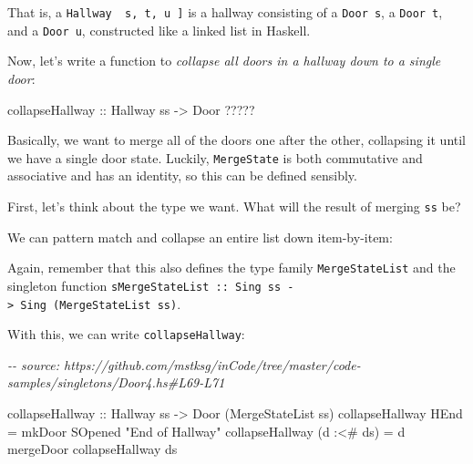 \documentclass[]{article}
\newenvironment{Shaded}{}{}
\newcommand{\CommentTok}[1]{\textcolor[rgb]{0.38,0.63,0.69}{\textit{#1}}}
\newcommand{\DataTypeTok}[1]{\textcolor[rgb]{0.56,0.13,0.00}{#1}}
\newcommand{\NormalTok}[1]{#1}
\newcommand{\OperatorTok}[1]{\textcolor[rgb]{0.40,0.40,0.40}{#1}}
\newcommand{\OtherTok}[1]{\textcolor[rgb]{0.00,0.44,0.13}{#1}}
\newcommand{\StringTok}[1]{\textcolor[rgb]{0.25,0.44,0.63}{#1}}
\begin{document}
That is, a \texttt{Hallway\ \textquotesingle{}{[}\ s,\ t,\ u\ {]}} is a hallway
consisting of a \texttt{Door\ s}, a \texttt{Door\ t}, and a \texttt{Door\ u},
constructed like a linked list in Haskell.

Now, let's write a function to \emph{collapse all doors in a hallway down to a
single door}:

\begin{Shaded}
\begin{Highlighting}[]
\OtherTok{collapseHallway ::} \DataTypeTok{Hallway}\NormalTok{ ss }\OtherTok{{-}\textgreater{}} \DataTypeTok{Door} \OperatorTok{?????}
\end{Highlighting}
\end{Shaded}

Basically, we want to merge all of the doors one after the other, collapsing it
until we have a single door state. Luckily, \texttt{MergeState} is both
commutative and associative and has an identity, so this can be defined
sensibly.

First, let's think about the type we want. What will the result of merging
\texttt{ss} be?

We can pattern match and collapse an entire list down item-by-item:

\begin{Shaded}
\end{Shaded}

Again, remember that this also defines the type family \texttt{MergeStateList}
and the singleton function
\texttt{sMergeStateList\ ::\ Sing\ ss\ -\textgreater{}\ Sing\ (MergeStateList\ ss)}.

With this, we can write \texttt{collapseHallway}:

\begin{Shaded}
\begin{Highlighting}[]
\CommentTok{{-}{-} source: https://github.com/mstksg/inCode/tree/master/code{-}samples/singletons/Door4.hs\#L69{-}L71}

\OtherTok{collapseHallway ::} \DataTypeTok{Hallway}\NormalTok{ ss }\OtherTok{{-}\textgreater{}} \DataTypeTok{Door}\NormalTok{ (}\DataTypeTok{MergeStateList}\NormalTok{ ss)}
\NormalTok{collapseHallway }\DataTypeTok{HEnd}       \OtherTok{=}\NormalTok{ mkDoor }\DataTypeTok{SOpened} \StringTok{"End of Hallway"}
\NormalTok{collapseHallway (d }\OperatorTok{:\textless{}\#}\NormalTok{ ds) }\OtherTok{=}\NormalTok{ d }\OtherTok{\textasciigrave{}mergeDoor\textasciigrave{}}\NormalTok{ collapseHallway ds}
\end{Highlighting}
\end{Shaded}
\end{document}

